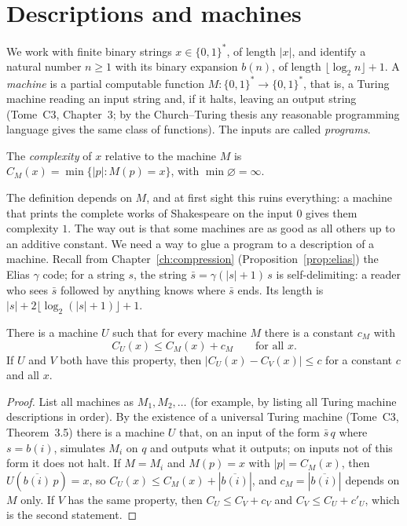 \section{Descriptions and machines}\label{sec:invariance}

We work with finite binary strings $x\in\{0,1\}^*$, of length $|x|$, and identify a natural number $n\ge1$ with its binary expansion $b(n)$, of length $\lfloor\log_2n\rfloor+1$. A \emph{machine} is a partial computable function $M:\{0,1\}^*\to\{0,1\}^*$, that is, a Turing machine reading an input string and, if it halts, leaving an output string (Tome~C3, Chapter~3; by the Church--Turing thesis any reasonable programming language gives the same class of functions). The inputs are called \emph{programs}.

\begin{definition}\label{def:plain}
The \emph{complexity} of $x$ relative to the machine $M$ is $C_M(x)=\min\{|p|:M(p)=x\}$, with $\min\varnothing=\infty$.
\end{definition}

The definition depends on $M$, and at first sight this ruins everything: a machine that prints the complete works of Shakespeare on the input $0$ gives them complexity $1$. The way out is that some machines are as good as all others up to an additive constant. We need a way to glue a program to a description of a machine. Recall from Chapter~\ref{ch:compression} (Proposition~\ref{prop:elias}) the Elias $\gamma$ code; for a string $s$, the string $\bar s=\gamma(|s|+1)\,s$ is self-delimiting: a reader who sees $\bar s$ followed by anything knows where $\bar s$ ends. Its length is $|s|+2\lfloor\log_2(|s|+1)\rfloor+1$.

\begin{theorem}\label{thm:invariance}
There is a machine $U$ such that for every machine $M$ there is a constant $c_M$ with
\[
C_U(x)\le C_M(x)+c_M\qquad\text{for all }x.
\]
If $U$ and $V$ both have this property, then $|C_U(x)-C_V(x)|\le c$ for a constant $c$ and all $x$.
\end{theorem}

\begin{proof}
List all machines as $M_1,M_2,\dots$ (for example, by listing all Turing machine descriptions in order). By the existence of a universal Turing machine (Tome~C3, Theorem~3.5) there is a machine $U$ that, on an input of the form $\bar s\,q$ where $s=b(i)$, simulates $M_i$ on $q$ and outputs what it outputs; on inputs not of this form it does not halt. If $M=M_i$ and $M(p)=x$ with $|p|=C_M(x)$, then $U(\overline{b(i)}\,p)=x$, so $C_U(x)\le C_M(x)+|\overline{b(i)}|$, and $c_M=|\overline{b(i)}|$ depends on $M$ only. If $V$ has the same property, then $C_U\le C_V+c_V$ and $C_V\le C_U+c'_U$, which is the second statement.
\end{proof}


